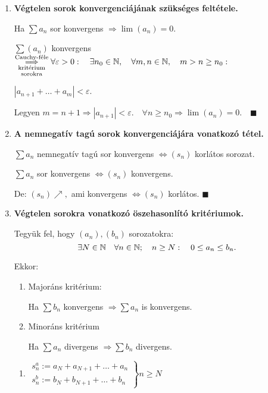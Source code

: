\documentclass[a4paper,11.5pt]{article}
\begin{document}
\begin{enumerate}
		\item \textbf{Végtelen sorok konvergenciájának szükséges feltétele.}
		
		Ha $\sum a_n$ sor konvergens $\Rightarrow \lim(a_n)=0$.
		
		\biz $\sum(a_n)$ konvergens $\underset{\text{sorokra}}{\underset{\text{kritérium}}{\overset{\text{Cauchy-féle}}{\Longrightarrow}}} \forall \varepsilon >0: \quad \exists n_0 \in \mathbb{N}, \quad \forall m,n \in \mathbb{N},\quad  m>n\geq n_0:$
		
		{\centering $ |a_{n+1}+\ldots+a_m|<\varepsilon.$ \par}
		
		Legyen $m=n+1 \Rightarrow |a_{n+1}|<\varepsilon. \quad \forall n\geq n_0 \Rightarrow \lim(a_n)=0. \quad\blacksquare$
		
		\item\textbf{A nemnegatív tagú sorok konvergenciájára vonatkozó tétel.}
		
		$\sum a_n $ nemnegatív tagú sor konvergens $\Leftrightarrow (s_n)$ korlátos sorozat.
		
		\biz $\sum a_n $ sor konvergens $\Leftrightarrow (s_n)$ konvergens.
		
		De: $(s_n)\nearrow,$ ami konvergens $\Leftrightarrow (s_n)$ korlátos. $\blacksquare$
		
		\item \textbf{Végtelen sorokra vonatkozó öszehasonlító kritériumok.}
		
		Tegyük fel, hogy $(a_n), (b_n)$ sorozatokra: \quad\[\exists N\in \mathbb{N} \quad \forall n \in \mathbb{N}; \quad n\geq N: \quad 0\leq a_n \leq b_n.\]
		
		Ekkor: 
		\begin{enumerate}
			\item Majoráns kritérium:
			
			Ha $\sum b_n$ konvergens $\Rightarrow \sum a_n$ is konvergens.
			
			\item Minoráns kritérium
			
			Ha $\sum a_n$ divergens $\Rightarrow \sum b_n$ divergens.
		\end{enumerate}
		
		\biz 
		\begin{enumerate}
			\item $\left.
			\begin{gathered}
			s_n^a:=a_N+a_{N+1}+\ldots +a_n\\
			s_n^b:=b_N+b_{N+1}+\ldots+b_n
			\end{gathered}\right\}n\geq N$
			

\end{enumerate}
\end{enumerate}
\end{document}
